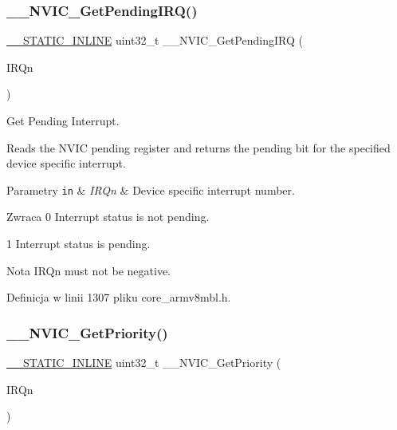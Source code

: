 \subsubsection{\texorpdfstring{\+\_\+\+\_\+\+N\+V\+I\+C\+\_\+\+Get\+Pending\+I\+R\+Q()}{\_\_NVIC\_GetPendingIRQ()}}
{\footnotesize\ttfamily \hyperlink{cmsis__iccarm_8h_aba87361bfad2ae52cfe2f40c1a1dbf9c}{\+\_\+\+\_\+\+S\+T\+A\+T\+I\+C\+\_\+\+I\+N\+L\+I\+NE} uint32\+\_\+t \+\_\+\+\_\+\+N\+V\+I\+C\+\_\+\+Get\+Pending\+I\+RQ (\begin{DoxyParamCaption}\item[{\hyperlink{group___peripheral__interrupt__number__definition_ga7e1129cd8a196f4284d41db3e82ad5c8}{I\+R\+Qn\+\_\+\+Type}}]{I\+R\+Qn }\end{DoxyParamCaption})}



Get Pending Interrupt. 

Reads the N\+V\+IC pending register and returns the pending bit for the specified device specific interrupt. 
\begin{DoxyParams}[1]{Parametry}
\mbox{\tt in}  & {\em I\+R\+Qn} & Device specific interrupt number. \\
\hline
\end{DoxyParams}
\begin{DoxyReturn}{Zwraca}
0 Interrupt status is not pending. 

1 Interrupt status is pending. 
\end{DoxyReturn}
\begin{DoxyNote}{Nota}
I\+R\+Qn must not be negative. 
\end{DoxyNote}


Definicja w linii 1307 pliku core\+\_\+armv8mbl.\+h.

\mbox{\label{group___c_m_s_i_s___core___n_v_i_c_functions_gaeb9dc99c8e7700668813144261b0bc73}} 
\subsubsection{\texorpdfstring{\+\_\+\+\_\+\+N\+V\+I\+C\+\_\+\+Get\+Priority()}{\_\_NVIC\_GetPriority()}}
{\footnotesize\ttfamily \hyperlink{cmsis__iccarm_8h_aba87361bfad2ae52cfe2f40c1a1dbf9c}{\+\_\+\+\_\+\+S\+T\+A\+T\+I\+C\+\_\+\+I\+N\+L\+I\+NE} uint32\+\_\+t \+\_\+\+\_\+\+N\+V\+I\+C\+\_\+\+Get\+Priority (\begin{DoxyParamCaption}\item[{\hyperlink{group___peripheral__interrupt__number__definition_ga7e1129cd8a196f4284d41db3e82ad5c8}{I\+R\+Qn\+\_\+\+Type}}]{I\+R\+Qn }\end{DoxyParamCaption})}



